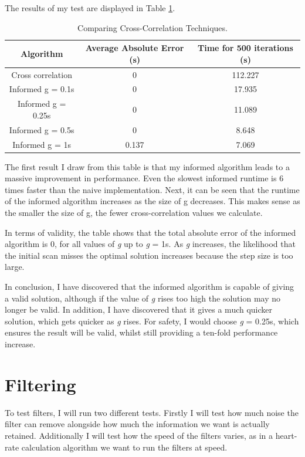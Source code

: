 \documentclass[12pt,a4paper,twoside,openright]{report}
\begin{document}
The results of my test are displayed in Table \ref{table:cross-correlation}. 

\begin{table}
\centering
\caption{Comparing Cross-Correlation Techniques.}
\label{table:cross-correlation}
\begin{tabular}{ | c | c | c | }
	\hline
	Algorithm & Average Absolute Error (s) & Time for 500
	iterations (s)\\ 
	\hline
	Cross correlation & 0 & 112.227 \\  
	Informed g = 0.1s & 0 & 17.935 \\    
	Informed g = 0.25s & 0 & 11.089 \\    
	Informed g = 0.5s & 0 & 8.648 \\    
	Informed g = 1s & 0.137 & 7.069  \\
	\hline
   \end{tabular}
\end{table}

The first result I draw from this table is that my informed algorithm leads to
a massive improvement in performance. Even the slowest informed runtime is 6
times faster than the naive implementation. Next, it can be seen that the
runtime of the informed algorithm increases as the size of g decreases. This
makes sense as the smaller the size of g, the fewer cross-correlation values
we calculate.

In terms of validity, the table shows that the total absolute error of the
informed algorithm is 0, for all values of \emph{g} up to \emph{g} = 1s. As
\emph{g} increases, the likelihood that the initial scan misses the optimal
solution increases because the step size is too large. 

In conclusion, I have discovered that the informed algorithm is capable of
giving a valid solution, although if the value of \emph{g} rises too high the
solution may no longer be valid. In addition, I have discovered that it gives
a much quicker solution, which gets quicker as \emph{g} rises. For safety, I
would choose \emph{g} = 0.25s, which ensures the result will be valid, whilst
still providing a ten-fold performance increase.


\section{Filtering}

To test filters, I will run two different tests. Firstly I will test how much
noise the filter can remove alongside how much the information we want is
actually retained. Additionally
I will test how the speed of the filters
varies, as in a heart-rate calculation algorithm we want to run the filters at
speed.
\end{document}
